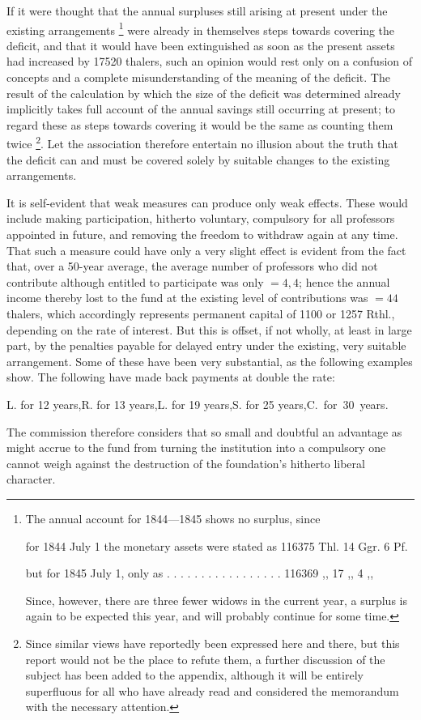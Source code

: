 If it were thought that the annual surpluses still arising at present under the existing arrangements {\renewcommand{\thefootnote}{**)}\footnote{The annual account for 1844—1845 shows no surplus, since
\par\noindent for 1844 July 1 the monetary assets were stated as 116375 Thl. 14 Ggr. 6 Pf.
\par\noindent but for 1845 July 1, only as . . . . . . . . . . . . . . . . . 116369 ,, 17 ,, 4 ,,
\par\noindent Since, however, there are three fewer widows in the current year, a surplus is again to be expected this year, and will probably continue for some time.}} were already in themselves steps towards covering the deficit, and that it would have been extinguished as soon as the present assets had increased by 17520 thalers, such an opinion would rest only on a confusion of concepts and a complete misunderstanding of the meaning of the deficit. The result of the calculation by which the size of the deficit was determined already implicitly takes full account of the annual savings still occurring at present; to regard these as steps towards covering it would be the same as counting them twice {\renewcommand{\thefootnote}{***)}\footnote{Since similar views have reportedly been expressed here and there, but this report would not be the place to refute them, a further discussion of the subject has been added to the appendix, although it will be entirely superfluous for all who have already read and considered the memorandum with the necessary attention.}}. Let the association therefore entertain no illusion about the truth
that the deficit can and must be covered solely by suitable changes to the existing arrangements.

It is self-evident that weak measures can produce only weak effects. These would include making participation, hitherto voluntary, compulsory for all professors appointed in future, and removing the freedom to withdraw again at any time. That such a measure could have only a very slight effect is evident from the fact that, over a 50-year average, the average number of professors who did not contribute although entitled to participate was only \(=4{,}4\); hence the annual income thereby lost to the fund at the existing level of contributions was \(=44\) thalers, which accordingly represents permanent capital of 1100 or 1257 Rthl., depending on the rate of interest. But this is offset, if not wholly, at least in large part, by the penalties payable for delayed entry under the existing, very suitable arrangement. Some of these have been very substantial, as the following examples show. The following have made back payments at double the rate:
\begin{center}
L. for 12 years,\quad R. for 13 years,\quad L. for 19 years,\quad S. for 25 years,\quad \mbox{C. for 30 years.}
\end{center}
\noindent\hspace*{\parindent}The commission therefore considers that so small and doubtful an advantage as might accrue to the fund from turning the institution into a compulsory one cannot weigh against the destruction of the foundation's hitherto liberal character.

